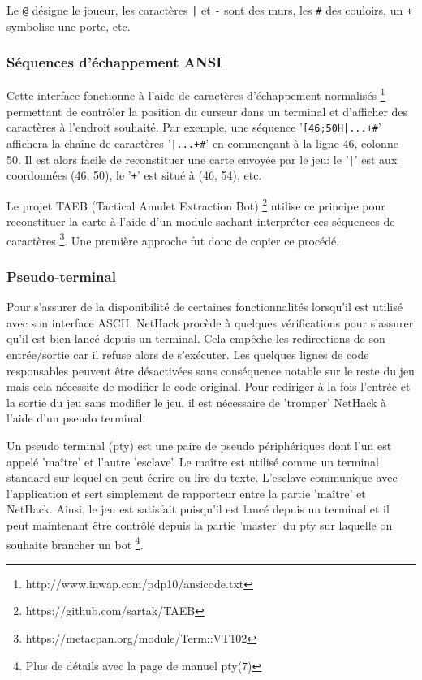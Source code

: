 \documentclass[a4paper,12pt]{article}
\begin{document}
Le \verb!@! désigne le joueur, les caractères \verb!|! et \verb!-! sont des
murs, les \verb!#! des couloirs, un \verb!+! symbolise une porte, etc.


\subsubsection*{Séquences d'échappement ANSI}

Cette interface fonctionne à l'aide de caractères d'échappement normalisés
\footnote{http://www.inwap.com/pdp10/ansicode.txt} permettant de contrôler la
position du curseur dans un terminal et d'afficher des caractères à l'endroit
souhaité. Par exemple, une séquence '\verb![46;50H|...+#!' affichera la chaîne
de caractères '\verb!|...+#!' en commençant à la ligne 46, colonne 50. Il est
alors facile de reconstituer une carte envoyée par le jeu: le '\verb!|!' est
aux coordonnées (46, 50), le '\verb!+!' est situé à (46, 54), etc.
	
Le projet TAEB (Tactical Amulet Extraction Bot)
\footnote{https://github.com/sartak/TAEB} utilise ce principe pour
reconstituer la carte à l'aide d'un module sachant interpréter ces séquences
de caractères \footnote{https://metacpan.org/module/Term::VT102}. Une première
approche fut donc de copier ce procédé.


\subsubsection*{Pseudo-terminal}

Pour s'assurer de la disponibilité de certaines fonctionnalités lorsqu'il est
utilisé avec son interface ASCII, NetHack procède à quelques vérifications
pour s'assurer qu'il est bien lancé depuis un terminal. Cela empêche les
redirections de son entrée/sortie car il refuse alors de s'exécuter. Les
quelques lignes de code responsables peuvent être désactivées sans conséquence
notable sur le reste du jeu mais cela nécessite de modifier le code original.
Pour rediriger à la fois l'entrée et la sortie du jeu sans modifier le jeu, il
est nécessaire de 'tromper' NetHack à l'aide d'un pseudo terminal.

Un pseudo terminal (pty) est une paire de pseudo périphériques dont l'un est
appelé 'maître' et l'autre 'esclave'. Le maître est utilisé comme un terminal
standard sur lequel on peut écrire ou lire du texte. L'esclave communique avec
l'application et sert simplement de rapporteur entre la partie 'maître' et
NetHack. Ainsi, le jeu est satisfait puisqu'il est lancé depuis un terminal et
il peut maintenant être contrôlé depuis la partie 'master' du pty sur laquelle
on souhaite brancher un bot \footnote{Plus de détails avec la page de manuel
pty(7)}.
\end{document}
